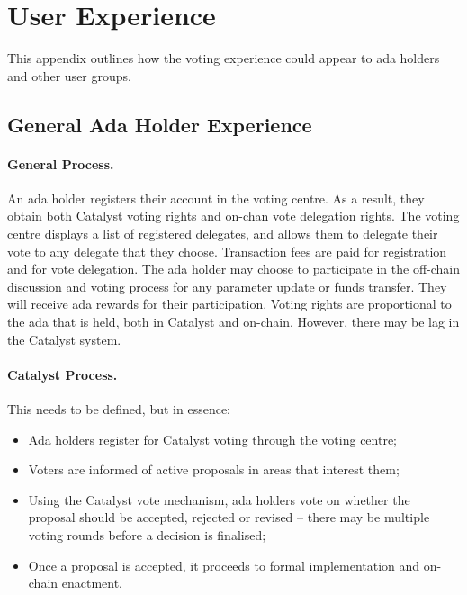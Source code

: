 \pagebreak
\section{User Experience}
\label{sect:ux}

This appendix outlines how the voting experience could appear to ada holders and other user groups.

\subsection{General Ada Holder Experience}

\paragraph{General Process.} An ada holder registers their account in the voting centre.  As a result, they obtain both Catalyst voting rights and on-chan vote delegation rights.
The voting centre displays a list of registered delegates, and allows them to delegate their vote to any delegate that they choose.  Transaction
fees are paid for registration and for vote delegation.  The ada holder may choose to participate in the off-chain discussion and voting process for any
parameter update or funds transfer. They will receive ada rewards for their participation.
Voting rights are proportional to the ada that is held, both in Catalyst and on-chain.  However, there may be lag in the Catalyst system.

\paragraph{Catalyst Process.}

This needs to be defined, but in essence:

\begin{itemize}
\item
  Ada holders register for Catalyst voting through the voting centre;
\item
  Voters are informed of active proposals in areas that interest them;
\item
  Using the Catalyst vote mechanism, ada holders vote on whether the proposal should be accepted, rejected or revised -- there may be multiple voting rounds
  before a decision is finalised;
\item
  Once a proposal is accepted, it proceeds to formal implementation and on-chain enactment.
\end{itemize}

